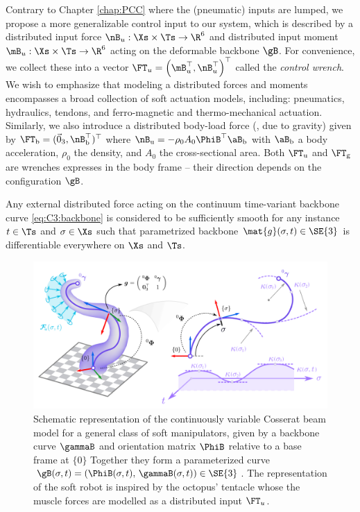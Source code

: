 \begin{asm}
\label{assum:0}
Contrary to Chapter \ref{chap:PCC} where the (pneumatic) inputs are lumped, we propose a more generalizable control input to our system, which is described by a distributed input force $\nB_u: \Xs \times \Ts \to \R^6$ and distributed input moment $\mB_u: \Xs \times \Ts \to \R^6$ acting on the deformable backbone $\gB$. For convenience, we collect these into a vector $\FT_u = \left(\mB_u^\top, \nB_u^\top \right)^\top$ called the \textit{control wrench}. We wish to emphasize that modeling a distributed forces and moments encompasses a broad collection of soft actuation models, including: pneumatics, hydraulics, tendons, and ferro-magnetic and thermo-mechanical actuation. Similarly, we also introduce a distributed body-load force (\eg, due to gravity) given by $\FT_\textrm{b} = (\vec{0}_3, \nB_\textrm{b}^\top)^\top$ where $\nB_\textrm{u} = -\rho_0 A_0 \PhiB^\top \aB_\textrm{b}$ with $\aB_\textrm{b}$ a body acceleration, $\rho_0$ the density, and $A_0$ the cross-sectional area. Both $\FT_\textrm{u}$ and $\FT_\textrm{g}$ are wrenches expresses in the body frame -- their direction depends on the configuration $\gB$. \end{asm}

\begin{asm}[On differentiability]
\label{assum:1}
Any external distributed force acting on the continuum time-variant backbone curve \eqref{eq:C3:backbone} is considered to be sufficiently smooth for any instance $t \in \Ts$ and $\sigma \in \Xs$ such that parametrized backbone $\mat{g}(\sigma,t) \in \SE{3}$ is differentiable everywhere on $\Xs$ and $\Ts$.
\end{asm}

\begin{figure}[!t]
  \vspace{-2mm}
  \centering
  \includegraphics[width = \textwidth]{./pdf/thesis-figure-5-1.pdf}
  \caption{Schematic representation of the continuously variable Cosserat beam model for a general class of soft manipulators, given by a backbone curve $\gammaB$ and orientation matrix $\PhiB$ relative to a base frame at $\{0\}$ Together they form a parameterized curve $\gB(\sigma,t) = (\PhiB(\sigma,t),\, \gammaB(\sigma,t)) \in \SE{3}$. The representation of the soft robot is inspired by the octopus' tentacle whose the muscle forces are modelled as a distributed input $\FT_u$. \label{fig:C3:example1}}
\end{figure}
%

